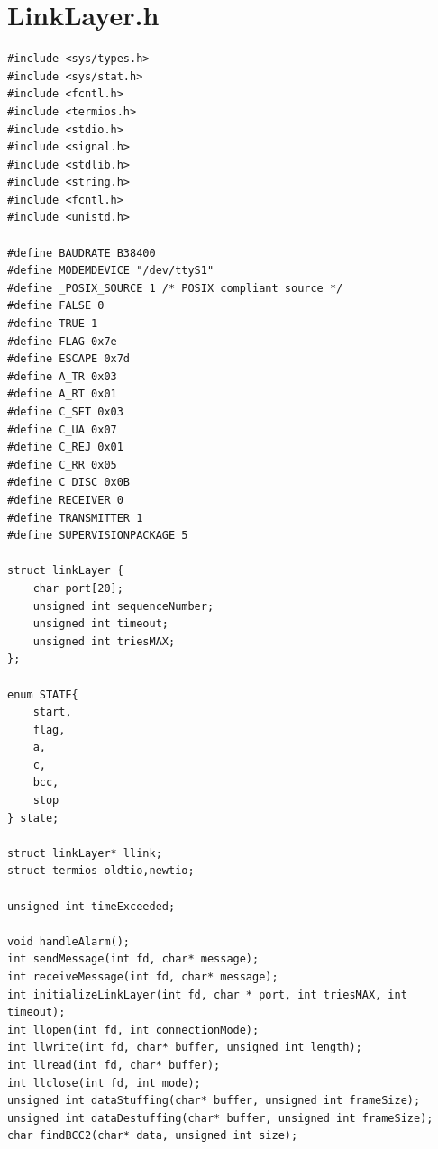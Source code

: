 \documentclass[a4paper]{article}
\begin{document}
\section{LinkLayer.h}
\begin{lstlisting}
#include <sys/types.h>
#include <sys/stat.h>
#include <fcntl.h>
#include <termios.h>
#include <stdio.h>
#include <signal.h>
#include <stdlib.h>
#include <string.h>
#include <fcntl.h>
#include <unistd.h>

#define BAUDRATE B38400
#define MODEMDEVICE "/dev/ttyS1"
#define _POSIX_SOURCE 1 /* POSIX compliant source */
#define FALSE 0
#define TRUE 1
#define FLAG 0x7e
#define ESCAPE 0x7d
#define A_TR 0x03
#define A_RT 0x01
#define C_SET 0x03
#define C_UA 0x07
#define C_REJ 0x01
#define C_RR 0x05
#define C_DISC 0x0B
#define RECEIVER 0
#define TRANSMITTER 1
#define SUPERVISIONPACKAGE 5

struct linkLayer {
    char port[20];
    unsigned int sequenceNumber;
    unsigned int timeout;
    unsigned int triesMAX;
};

enum STATE{
	start,
	flag,
	a,
	c,
	bcc,
	stop
} state;

struct linkLayer* llink;
struct termios oldtio,newtio;

unsigned int timeExceeded;

void handleAlarm();
int sendMessage(int fd, char* message);
int receiveMessage(int fd, char* message);
int initializeLinkLayer(int fd, char * port, int triesMAX, int timeout);
int llopen(int fd, int connectionMode);
int llwrite(int fd, char* buffer, unsigned int length);
int llread(int fd, char* buffer);
int llclose(int fd, int mode);
unsigned int dataStuffing(char* buffer, unsigned int frameSize);
unsigned int dataDestuffing(char* buffer, unsigned int frameSize);
char findBCC2(char* data, unsigned int size);
\end{lstlisting}
\newpage
\end{document}
